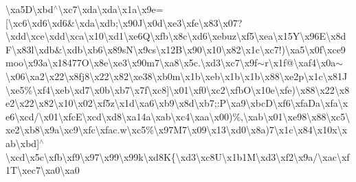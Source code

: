 \begin{DoxyCompactItemize}
\textbackslash{}xa5\+D\textbackslash{}xbd$^\wedge$\textbackslash{}xc7\textbackslash{}xda\textbackslash{}xda\textbackslash{}x1a\textbackslash{}x9e=\mbox{[}\textbackslash{}xc6\textbackslash{}xd6\textbackslash{}xd6\&\textbackslash{}xda\textbackslash{}xdb;\textbackslash{}x90\+J\textbackslash{}x0d\textbackslash{}xe3\textbackslash{}xfe\textbackslash{}x83\textbackslash{}x07?\textbackslash{}xdd\textbackslash{}xce\textbackslash{}xdd\textbackslash{}xca\textbackslash{}x10\textbackslash{}xd1\textbackslash{}xe6\+Q\textbackslash{}xfb\textbackslash{}x8c\textbackslash{}xd6\textbackslash{}xebuz\textbackslash{}xf5\textbackslash{}xea\textbackslash{}x15\+Y\textbackslash{}x96\+E\textbackslash{}x8d\+F\textbackslash{}x83l\textbackslash{}xdb\&\textbackslash{}xdb\textbackslash{}xb6\textbackslash{}x89s\+N\textbackslash{}x9cs\textbackslash{}x12\+B\textbackslash{}x90\textbackslash{}x10\textbackslash{}x82\textbackslash{}x1c\textbackslash{}xc7!)\textbackslash{}xa5\textbackslash{}x0f\textbackslash{}xce9moo\textbackslash{}x93a\textbackslash{}x18477\+O\textbackslash{}x8e\textbackslash{}xe3\textbackslash{}x90m7\textbackslash{}xa8\textbackslash{}x5c.\textbackslash{}xd3\textbackslash{}xc7\textbackslash{}x9f$\sim$r\textbackslash{}x1f@\textbackslash{}xaf\textquotesingle{}4\textbackslash{}x0a$\sim$\textbackslash{}x06\textbackslash{}xa2\textbackslash{}x22\textbackslash{}x8fj8\textbackslash{}x22\textbackslash{}x82\textbackslash{}xe38\textbackslash{}xb0m\textbackslash{}x1b\textbackslash{}xeb\textbackslash{}x1b\textbackslash{}x1b\textbackslash{}x88\textquotesingle{}\textbackslash{}xe2p\textbackslash{}x1c\textbackslash{}x81\+J\textbackslash{}xe5\%\textbackslash{}xf4\textbackslash{}xeb\textbackslash{}xd7\textbackslash{}x0b\textbackslash{}xb7\textbackslash{}x7f\textbackslash{}xc8\mbox{]}\textbackslash{}x01\textbackslash{}xf0\textbackslash{}xc2\textbackslash{}xfb\+O\textbackslash{}x10e\textbackslash{}xfe)\textbackslash{}x88\textbackslash{}x22\textbackslash{}x8e2\textbackslash{}x22\textbackslash{}x82\textbackslash{}x10\textbackslash{}x02\textbackslash{}xf5z\textbackslash{}x1d\textbackslash{}xa6\textbackslash{}xb9\textbackslash{}x8d\textbackslash{}xb7;\+:\+P\textbackslash{}xa9\textbackslash{}xbc\+D\textbackslash{}xf6\textbackslash{}xfa\+Da\textbackslash{}xfa\textbackslash{}xe6\textbackslash{}xcd/\textbackslash{}x01\textbackslash{}xfc\+E\textbackslash{}xcd\textbackslash{}xd8\textbackslash{}xa14a\textbackslash{}xab\textbackslash{}xc4\textbackslash{}xaa\textbackslash{}x00)\%,\textbackslash{}xab\textbackslash{}x01\textbackslash{}xe98\textbackslash{}x88\textbackslash{}xc5\textbackslash{}xe2\textbackslash{}xb8\textbackslash{}x9a\textbackslash{}xc9\textbackslash{}xfc\textbackslash{}xfac.\+w\textbackslash{}xc5\%\textbackslash{}x97\+M7\textbackslash{}x09\textbackslash{}x13\textbackslash{}xd0\textbackslash{}x8a)7\textbackslash{}x1c\textbackslash{}x84\textbackslash{}x10x\textbackslash{}xab\textbackslash{}xbd\mbox{]}$^\wedge$\textbackslash{}xcd\textbackslash{}x5c\textbackslash{}xfb\textbackslash{}xf9\textbackslash{}x97\textbackslash{}x99\textbackslash{}x99k\textbackslash{}xd8\+K\{\textbackslash{}xd3\textbackslash{}xc8\+U\textbackslash{}x1b1\+M\textbackslash{}xd3\textbackslash{}xf2\textbackslash{}x9a/\textbackslash{}xac\textbackslash{}xf1\+T\textbackslash{}xec7\textbackslash{}xa0\textbackslash{}xa0\textbacksla
\end{DoxyCompactItemize}
